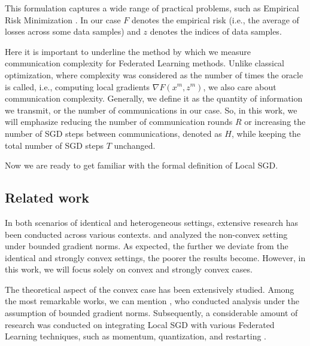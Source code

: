 \vspace{10pt}

This formulation captures a wide range of practical problems, such as Empirical Risk Minimization \citep{Vapnik}. In our case \( F \) denotes the empirical risk (i.e., the average of losses across some data samples) and \( z \) denotes the indices of data samples.

\vspace{10pt}

Here it is important to underline the method by which we measure communication complexity for Federated Learning methods. Unlike classical optimization, where complexity was considered as the number of times the oracle is called, i.e., computing local gradients $\nabla F(x^m, z^m)$, we also care about communication complexity. Generally, we define it as the quantity of information we transmit, or the number of communications in our case.
So, in this work, we will emphasize reducing the number of communication rounds $R$ or increasing the number of SGD steps between communications, denoted as $H$, while keeping the total number of SGD steps $T$ unchanged.

\vspace{10pt}

Now we are ready to get familiar with the formal definition of Local SGD.



\vspace{10pt}

\subsection{Related work}

In both scenarios of identical and heterogeneous settings, extensive research has been conducted across various contexts. \cite{Li} and \cite{haddapour} analyzed the non-convex setting under bounded gradient norms. As expected, the further we deviate from the identical and strongly convex settings, the poorer the results become. However, in this work, we will focus solely on convex and strongly convex cases.

\vspace{10pt}

The theoretical aspect of the convex case has been extensively studied. Among the most remarkable works, we can mention \cite{Stich}, who conducted analysis under the assumption of bounded gradient norms. Subsequently, a considerable amount of research was conducted on integrating Local SGD with various Federated Learning techniques, such as momentum, quantization, and restarting \citep{fedpaq, spider, restarts}.

